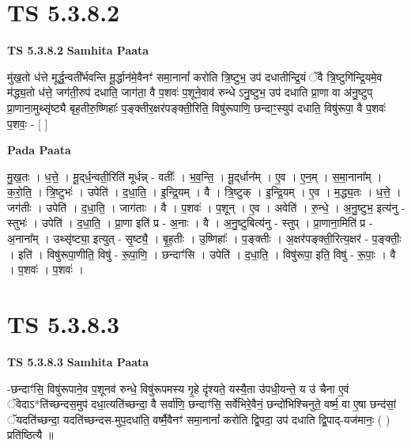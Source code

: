 \documentclass[17pt]{extarticle}
\begin{document}
\section*{ TS 5.3.8.2 }

\textbf{TS 5.3.8.2 } \newline
\textbf{Samhita Paata} \newline

मु॑ख॒तो ध॑त्ते मूर्द्ध॒न्वती᳚र्भवन्ति मू॒र्द्धान॑मे॒वैनꣳ॑ समा॒नानां᳚ करोति त्रि॒ष्टुभ॒ उप॑ दधातीन्द्रि॒यं ॅवै त्रि॒ष्टुगि॑न्द्रि॒यमे॒व म॑द्ध्य॒तो ध॑त्ते॒ जग॑ती॒रुप॑ दधाति॒ जाग॑ता॒ वै प॒शवः॑ प॒शूने॒वाव॑ रुन्धे ऽनु॒ष्टुभ॒ उप॑ दधाति प्रा॒णा वा अ॑नु॒ष्टुप् प्रा॒णाना॒मुथ्सृ॑ष्ट्यै बृह॒तीरु॒ष्णिहाः᳚ प॒ङ्क्तीर॒क्षर॑पङ्क्ती॒रिति॒ विषु॑रूपाणि॒ छन्दाꣳ॒॒स्युप॑ दधाति॒ विषु॑रूपा॒ वै प॒शवः॑ प॒शवः॒ - [  ] \newline

\textbf{Pada Paata} \newline

मु॒ख॒तः । ध॒त्ते॒ । मू॒द्‌र्ध॒न्वती॒रिति॑ मूर्धन्न् - वतीः᳚ । भ॒व॒न्ति॒ । मू॒द्‌र्धान᳚म् । ए॒व । ए॒न॒म् । स॒मा॒नाना᳚म् । क॒रो॒ति॒ । त्रि॒ष्टुभः॑ । उपेति॑ । द॒धा॒ति॒ । इ॒न्द्रि॒यम् । वै । त्रि॒ष्टुक् । इ॒न्द्रि॒यम् । ए॒व । म॒द्ध्य॒तः । ध॒त्ते॒ । जग॑तीः । उपेति॑ । द॒धा॒ति॒ । जाग॑ताः । वै । प॒शवः॑ । प॒शून् । ए॒व । अवेति॑ । रु॒न्धे॒ । अ॒नु॒ष्टुभ॒ इत्य॑नु - स्तुभः॑ । उपेति॑ । द॒धा॒ति॒ । प्रा॒णा इति॑ प्र - अ॒नाः । वै । अ॒नु॒ष्टुबित्य॑नु - स्तुप् । प्रा॒णाना॒मिति॑ प्र -  अ॒नाना᳚म् । उथ्सृ॑ष्ट्या॒ इत्युत् - सृ॒ष्ट्यै॒ । बृ॒ह॒तीः । उ॒ष्णिहाः᳚ । प॒ङ्क्तीः । अ॒क्षर॑पङ्क्ती॒रित्य॒क्षर॑ - प॒ङ्क्तीः॒ । इति॑ । विषु॑रूपा॒णीति॒ विषु॑ - रू॒पा॒णि॒ । छन्दाꣳ॑सि । उपेति॑ । द॒धा॒ति॒ । विषु॑रूपा॒ इति॒ विषु॑ - रू॒पाः॒ । वै । प॒शवः॑ । प॒शवः॑ ।  \newline




\section*{ TS 5.3.8.3 }

\textbf{TS 5.3.8.3 } \newline
\textbf{Samhita Paata} \newline

-छन्दाꣳ॑सि॒ विषु॑रूपाने॒व प॒शूनव॑ रुन्धे॒ विषु॑रूपमस्य गृ॒हे दृ॑श्यते॒ यस्यै॒ता उ॑पधी॒यन्ते॒ य उ॑ चैना ए॒वं ॅवेदाऽ*ति॑च्छन्दस॒मुप॑ दधा॒त्यति॑च्छन्दा॒ वै सर्वा॑णि॒ छन्दाꣳ॑सि॒ सर्वे॑भिरे॒वैनं॒ छन्दो॑भिश्चिनुते॒ वर्ष्म॒ वा ए॒षा छन्द॑सां॒ ॅयदति॑च्छन्दा॒ यदति॑च्छन्दस-मुप॒दधा॑ति॒ वर्ष्मै॒वैनꣳ॑ समा॒नानां᳚ करोति द्वि॒पदा॒ उप॑ दधाति द्वि॒पाद्-यज॑मानः॒ ( ) प्रति॑ष्ठित्यै ॥ \newline
\end{document}
